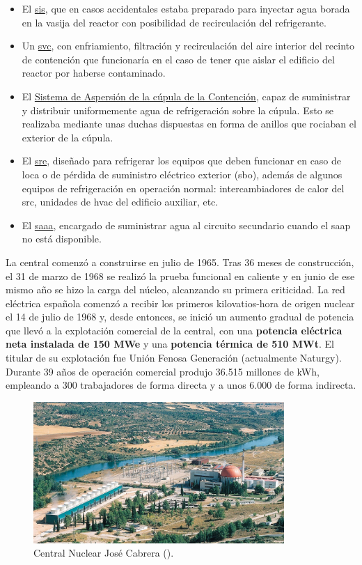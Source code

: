 \begin{itemize}
  \item El \underline{\acrlong{sis}}, que en casos accidentales estaba preparado para inyectar agua borada en la vasija del reactor con posibilidad de recirculación del refrigerante.
  \item Un \underline{\acrlong{svc}}, con enfriamiento, filtración y recirculación del aire interior del recinto de contención que funcionaría en el caso de tener que aislar el edificio del reactor por haberse contaminado.
  \item El \underline{Sistema de Aspersión de la cúpula de la Contención}, capaz de suministrar y distribuir uniformemente agua de refrigeración sobre la cúpula. Esto se realizaba mediante unas duchas dispuestas en forma de anillos que rociaban el exterior de la cúpula.
  \item El \underline{\acrlong{sre}}, diseñado para refrigerar los equipos que deben funcionar en caso de \acrshort{loca} o de pérdida de suministro eléctrico exterior (\acrshort{sbo}), además de algunos equipos de refrigeración en operación normal: intercambiadores de calor del \acrlong{src}, unidades de \acrshort{hvac} del edificio auxiliar, etc.
  \item El \underline{\acrlong{saaa}}, encargado de suministrar agua al circuito secundario cuando el \acrlong{saap} no está disponible.
\end{itemize}

La central comenzó a construirse en julio de 1965. Tras 36 meses de construcción, el 31 de marzo de 1968 se realizó la prueba funcional en caliente y en junio de ese mismo año se hizo la carga del núcleo, alcanzando su primera criticidad. La red eléctrica española comenzó a recibir los primeros kilovatios-hora de origen nuclear el 14 de julio de 1968 y, desde entonces, se inició un aumento gradual de potencia que llevó a la explotación comercial de la central, con una \textbf{potencia eléctrica neta instalada de 150 MWe} y una \textbf{potencia térmica de 510 MWt}. El titular de su explotación fue Unión Fenosa Generación (actualmente Naturgy). Durante 39 años de operación comercial produjo 36.515 millones de kWh, empleando a 300 trabajadores de forma directa y a unos 6.000 de forma indirecta.

\begin{figure}[h]
    \centering
    \includegraphics[width=0.85\textwidth]{content/figures/zorita.jpg}
    \caption{Central Nuclear José Cabrera (\cite{sne_recursos_prensa}).}
    \label{fig:zorita}
\end{figure}

